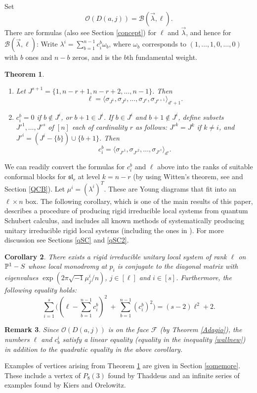 \documentclass[11pt]{amsart}
\newcommand\mf{\mathcal{F}}
\newtheorem{theorem}{Theorem}[section]
\newtheorem{remark}[theorem]{ Remark}
\newtheorem{corollary}[theorem]{Corollary}
\numberwithin{theorem}{subsection}
\begin{document}
Set $$\mathcal{O}(D(a,j))=\mathcal{B}(\vec{\lambda},\ell).$$
There are formulas (also see Section \ref{concept}) for $\ell$ and $\vec{\lambda}$, and hence for $\mathcal{B}(\vec{\lambda},\ell)$:
Write $\lambda^i=\sum_{b=1}^{n-1} c_{i}^b\omega_b$, where $\omega_b$ corresponds to $(1,\dots,1,0,\dots,0)$ with $b$ ones and $n-b$ zeros, and is the $b$th fundamental weight.
\begin{theorem}\label{brahms}
\hspace{2em}
\begin{enumerate}
\item Let $J^{s+1}=\{1,n-r+1,n-r+2,\dots,n-1\}$. Then
\begin{equation}\label{formulel}
\ell=\langle\sigma_{J^1}, \sigma_{J^2},\dots,\sigma_{J^s},\sigma_{J^{s+1}}\rangle_{d'+1}.
\end{equation}
\item $c_{i}^{b}=0$ if $b\not\in J^i$, or $b+1\in J^i$. If $b\in J^i$ and $b+1\not\in J^i$, define subsets $J'^1,\dots,J'^s$ of $[n]$
 each of cardinality $r$ as follows: $J'^k=J^k$ if $k\neq i$, and $J'^i=(J^i-\{b\})\cup \{b+1\}$. Then
$$c_i^{b}= \langle\sigma_{J'^1}, \sigma_{J'^2},\dots,\sigma_{J'^s}\rangle_{d'}.$$
\end{enumerate}
\end{theorem}
We can readily convert the formulas for $c_i^b$ and $\ell$ above into the ranks of suitable conformal blocks for $\mathfrak{sl}_r$  at level $k=n-r$ (by using Witten's theorem, see \cite[Proposition 3.4]{BHorn} and Section \ref{QCB}).
Let $\mu^i=(\lambda^i)^T$. These are Young diagrams that fit into an $\ell\times n$ box. The following corollary, which is one of the main results of this paper, describes a procedure of producing rigid irreducible local systems from quantum Schubert calculus, and includes all known methods of systematically producing unitary irreducible rigid local systems (including the ones in \cite{BH,Haraoka}). For more
discussion see Sections \ref{qSC} and \ref{qSC2}.
\begin{corollary}\label{existence}
There exists a rigid irreducible unitary local system of rank $\ell$ on $\Bbb{P}^1-S$ whose local monodromy at $p_i$ is conjugate to the diagonal matrix with eigenvalues  $\exp(2\pi\sqrt{-1}\mu_j^i/n)$, $j\in[\ell]$ and $i\in[s]$. Furthermore, the following  equality holds:
  $$\sum_{i=1}^s \bigl((\ell-\sum_{b=1}^{n-1} c^b_i)^2 \ + \ \sum_{b=1}^{n-1}(c^b_i)^2\bigr)=(s-2)\ell^2+2.$$
\end{corollary}
\begin{remark}\label{brahms2}
Since $\mathcal{O}(D(a,j))$ is on the face $\mf$ (by Theorem \ref{Adagio}), the numbers $\ell$ and $c^i_b$ satisfy a linear equality (equality in the inequality \eqref{wallnew}) in addition to the quadratic equality in the above corollary.
\end{remark}
Examples of vertices arising from Theorem \ref{brahms} are given in Section \ref{somemore}. These include a vertex of $P_8(3)$ found by Thaddeus \cite{thaddy} and an infinite series of examples found by Kiers and Orelowitz.
\end{document}
